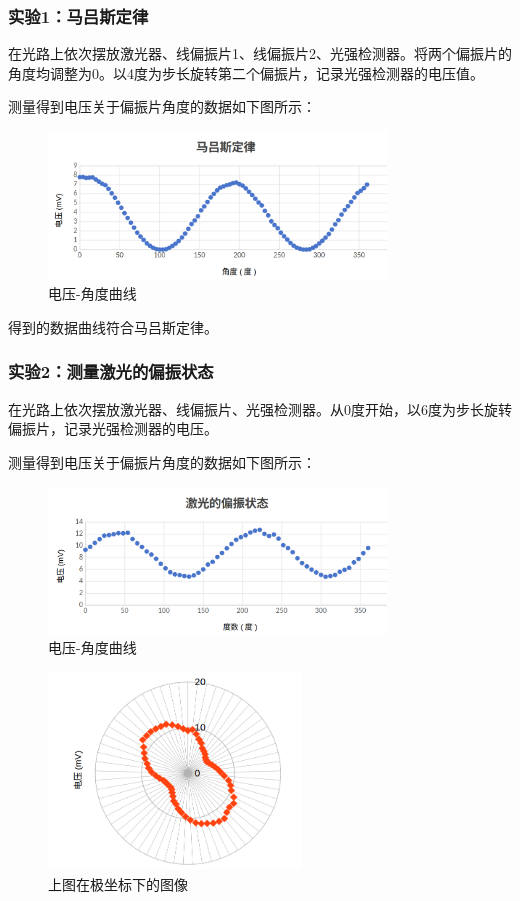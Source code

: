 \documentclass{ctexart}
\begin{document}
\subsubsection{实验1：马吕斯定律}
在光路上依次摆放激光器、线偏振片1、线偏振片2、光强检测器。将两个偏振片的角度均调整为0。以4度为步长旋转第二个偏振片，记录光强检测器的电压值。

测量得到电压关于偏振片角度的数据如下图所示：
\begin{figure}[H]
    \centering
    \includegraphics[width=0.8\textwidth]{实验一.png}
    \caption{电压-角度曲线}
\end{figure}

得到的数据曲线符合马吕斯定律。

\subsubsection{实验2：测量激光的偏振状态}
在光路上依次摆放激光器、线偏振片、光强检测器。从0度开始，以6度为步长旋转偏振片，记录光强检测器的电压。

测量得到电压关于偏振片角度的数据如下图所示：
\begin{figure}[H]
    \centering
    \includegraphics[width=0.8\textwidth]{实验二.png}
    \caption{电压-角度曲线}
\end{figure}
\begin{figure}[H]
    \centering
    \includegraphics[width=0.6\textwidth]{实验二-2.png}
    \caption{上图在极坐标下的图像}
\end{figure}
\end{document}
